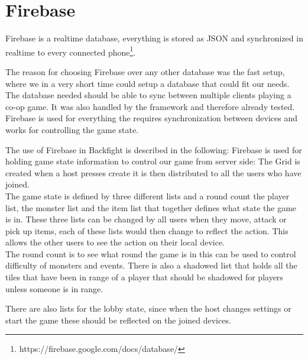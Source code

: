 \section{Firebase}

Firebase is a realtime database, everything is stored as JSON and synchronized in realtime to every connected phone\footnote{https://firebase.google.com/docs/database/}.

The reason for choosing Firebase over any other database was the fast setup, where we in a very short time could setup a database that could fit our needs. The database needed should be able to sync between multiple clients playing a co-op game. It was also handled by the framework and therefore already tested. Firebase is used for everything the requires synchronization between devices and works for controlling the game state.

The use of Firebase in Backfight is described in the following:
Firebase is used for holding game state information to control our game from server side:
The Grid is created when a host presses create it is then distributed to all the users who have joined.
\\
The game state is defined by three different lists and a round count the player list, the monster list and the item list that together defines what state the game is in. These three lists can be changed by all users when they move, attack or pick up items, each of these lists would then change to reflect the action. This allows the other users to see the action on their local device.
\\
The round count is to see what round the game is in this can be used to control difficulty of monsters and events. There is also a shadowed list that holds all the tiles that have been in range of a player that should be shadowed for players unless someone is in range.

There are also lists for the lobby state, since when the host changes settings or start the game these should be reflected on the joined devices.